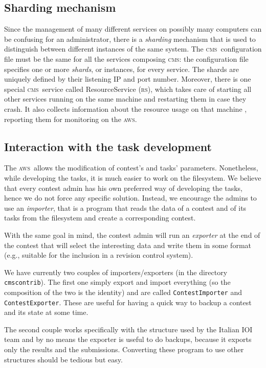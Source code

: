 \documentclass[a4paper,8pt]{amsart}
\newcommand{\CMS}{\textsc{cms}}
\newcommand{\RS}{\textsc{rs}}
\newcommand{\AWS}{\textsc{aws}}
\newcommand{\file}[1]{\texttt{#1}}
\begin{document}
\begin{multicols}{2}
  \subsection{Sharding mechanism}
  \label{ssec:sharding}

  Since the management of many different services on possibly many
  computers can be confusing for an administrator, there is a
  \emph{sharding} mechanism that is used to distinguish between
  different instances of the same system. The \CMS\ configuration file
  must be the same for all the services composing \CMS: the
  configuration file specifies one or more \emph{shards}, or
  instances, for every service. The shards are uniquely defined by
  their listening IP and port number. Moreover, there is one special
  \CMS\ service called ResourceService (\RS), which takes care of
  starting all other services running on the same machine and
  restarting them in case they crash. It also collects information
  about the resource usage on that machine
, reporting them for
  monitoring on the \AWS.

  \subsection{Interaction with the task development}

  The \AWS\ allows the modification of contest's and tasks'
  parameters. Nonetheless, while developing the tasks, it is much
  easier to work on the filesystem. We believe that every contest
  admin has his own preferred way of developing the tasks, hence we do
  not force any specific solution. Instead, we encourage the admins to
  use an \emph{importer\/}, that is a program that reads the data of a
  contest and of its tasks from the filesystem and create a
  corresponding contest.

  With the same goal in mind, the contest admin will run an
  \emph{exporter\/} at the end of the contest that will select the
  interesting data and write them in some format (e.g., suitable for
  the inclusion in a revision control system).

  We have currently two couples of importers/exporters (in the
  directory \file{cmscontrib}). The first one simply export and import
  everything (so the composition of the two is the identity) and are
  called \file{ContestImporter} and \file{ContestExporter}. These are
  useful for having a quick way to backup a contest and its state at
  some time.

  The second couple works specifically with the structure used by the
  Italian IOI team and by no means the exporter is useful to do
  backups, because it exports only the results and the submissions.
  Converting these program to use other structures should be tedious
  but easy.


\end{multicols}
\end{document}
